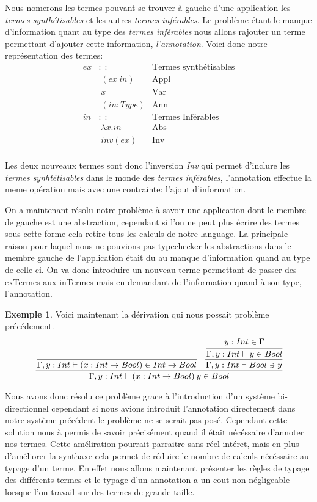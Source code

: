 \documentclass {article}
\theoremstyle{definition}
\newtheorem{example}{Exemple}
\theoremstyle{remark}
\begin{document}
Nous nomerons les termes pouvant se trouver à gauche d'une application les \emph{termes synthétisables} et les 
autres \emph{termes inférables}.
Le problème étant le manque d'information quant au type des \emph{termes inférables} nous allons rajouter un terme
permettant d'ajouter cette information, \emph{l'annotation}.
Voici donc notre représentation des termes:
\begin{align*}
  ex &::= & \mbox{Termes synthétisables} \\
  &| (ex\: in) &\mbox{Appl} \\
  &| x &\mbox{Var} \\
  &| (in:Type)&\mbox{Ann} \\
  in &::= & \mbox{Termes Inférables} \\
  &|\lambda x.in &\mbox{Abs} \\ 
  &|inv(ex) &\mbox{Inv} \\
\end{align*}

Les deux nouveaux termes sont donc l'inversion \emph{Inv} qui permet d'inclure les 
\emph{termes synhtétisables} dans le monde des \emph{termes inférables}, l'annotation 
effectue la meme opération mais avec une contrainte: l'ajout d'information.

On a maintenant résolu notre problème à savoir une application dont le membre de gauche
est une abstraction, cependant si l'on ne peut plus écrire des termes sous cette forme
cela retire tous les calculs de notre language.
La principale raison pour laquel nous ne pouvions pas typechecker les abstractions 
dans le membre gauche de l'application était du au manque d'information quand au type 
de celle ci.
On va donc introduire un nouveau terme permettant de passer des exTermes aux inTermes 
mais en demandant de l'information quand à son type, l'annotation.


\begin{example}
  Voici maintenant la dérivation qui nous possait problème précédement.
  \begin{align*}
    \cfrac{
      \cfrac{
      }{\Gamma,y:Int\vdash (x:Int\rightarrow Bool) \in Int\rightarrow Bool}\:\:\:\:%
      \cfrac{
        \cfrac{y:Int \in \Gamma}{\Gamma,y:Int\vdash y \in Bool}%
      }{\Gamma,y:Int\vdash Bool \ni y}%
    }{\Gamma,y:Int\vdash \App{(x:Int\rightarrow Bool)}{y} \in Bool}%
  \end{align*}
\end{example}

Nous avons donc résolu ce problème grace à l'introduction d'un système bi-directionnel
cependant si nous avions introduit l'annotation directement dans notre système précédent le 
problème ne se serait pas posé. Cependant cette solution nous à permis de savoir précisément 
quand il était nécéssaire d'annoter nos termes. Cette améliration pourrait parraitre sans réel 
intéret, mais en plus d'améliorer la synthaxe cela permet de réduire le nombre de calculs 
nécéssaire au typage d'un terme. En effet nous allons maintenant présenter les règles de typage
des différents termes et le typage d'un annotation a un cout non négligeable lorsque l'on travail
sur des termes de grande taille.
\end{document}
